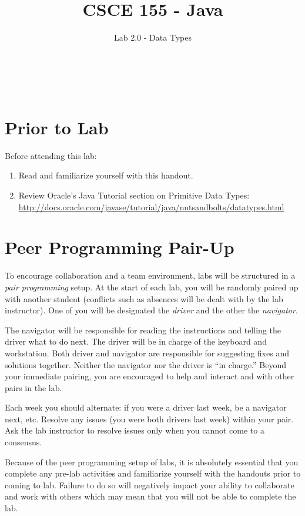 \documentclass[12pt]{scrartcl}
\title{CSCE 155 - Java}
\subtitle{Lab 2.0 - Data Types}
\author{~}
\date{~}
\begin{document}
\maketitle

\section*{Prior to Lab}

Before attending this lab:
\begin{enumerate}
  \item Read and familiarize yourself with this handout.
  \item Review Oracle's Java Tutorial section on Primitive Data Types:\\
	\url{http://docs.oracle.com/javase/tutorial/java/nutsandbolts/datatypes.html}
\end{enumerate}

\section*{Peer Programming Pair-Up}

To encourage collaboration and a team environment, labs will be
structured in a \emph{pair programming} setup.  At the start of
each lab, you will be randomly paired up with another student 
(conflicts such as absences will be dealt with by the lab instructor).
One of you will be designated the \emph{driver} and the other
the \emph{navigator}.  

The navigator will be responsible for reading the instructions and
telling the driver what to do next.  The driver will be in charge of the
keyboard and workstation.  Both driver and navigator are responsible
for suggesting fixes and solutions together.  Neither the navigator
nor the driver is ``in charge.''  Beyond your immediate pairing, you
are encouraged to help and interact and with other pairs in the lab.

Each week you should alternate: if you were a driver last week, 
be a navigator next, etc.  Resolve any issues (you were both drivers
last week) within your pair.  Ask the lab instructor to resolve issues
only when you cannot come to a consensus.  

Because of the peer programming setup of labs, it is absolutely 
essential that you complete any pre-lab activities and familiarize
yourself with the handouts prior to coming to lab.  Failure to do
so will negatively impact your ability to collaborate and work with 
others which may mean that you will not be able to complete the
lab.  
\end{document}
